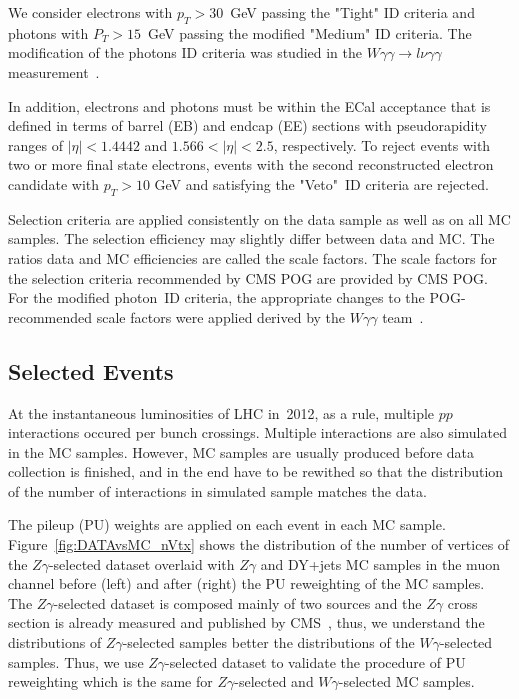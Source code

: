 We consider electrons with $p_T>30$~GeV passing the "Tight" ID criteria and photons with $P_T>15$~GeV passing the modified "Medium" ID criteria. The modification of the photons ID criteria was studied in the $W\gamma\gamma \rightarrow l\nu\gamma\gamma$ measurement~\cite{ref_Wgg8TeV}. 

In addition, electrons and photons must be within the ECal acceptance that is defined in terms of barrel (EB) and endcap (EE) sections with pseudorapidity ranges of $|\eta| < 1.4442$ and $1.566 < |\eta| < 2.5$, respectively. To reject events with two or more final state electrons, events with the second reconstructed electron candidate with $p_T>10$ GeV and satisfying the "Veto"~ID criteria are rejected. %

Selection criteria are applied consistently on the data sample as well as on all MC samples. The selection efficiency may slightly differ between data and MC. The ratios data and MC efficiencies are called the scale factors. The scale factors for the selection criteria recommended by CMS POG are provided by CMS POG. For the modified photon~ID criteria, the appropriate changes to the POG-recommended scale factors were applied derived by the $W\gamma\gamma$ team~\cite{ref_Wgg8TeV}.



\subsection{Selected Events}


At the instantaneous luminosities of LHC in~2012, as a rule, multiple $pp$ interactions occured per bunch crossings. Multiple interactions are also simulated in the MC samples. However, MC samples are usually produced before data collection is finished, and in the end have to be rewithed so that the distribution of the number of interactions in simulated sample matches the data.

The pileup (PU) weights are applied on each event in each MC sample. Figure~\ref{fig:DATAvsMC_nVtx} shows the distribution of the number of vertices of the $Z\gamma$-selected dataset overlaid with $Z\gamma$ and DY+jets MC samples in the muon channel before (left) and after (right) the PU reweighting of the MC samples. The $Z\gamma$-selected dataset is composed mainly of two sources and the $Z\gamma$ cross section is already measured and published by CMS~\cite{ref_Zg8TeV}, thus, we understand the distributions of $Z\gamma$-selected samples better the distributions of the $W\gamma$-selected samples. Thus, we use $Z\gamma$-selected dataset to validate the procedure of PU reweighting which is the same for $Z\gamma$-selected and $W\gamma$-selected MC samples.

